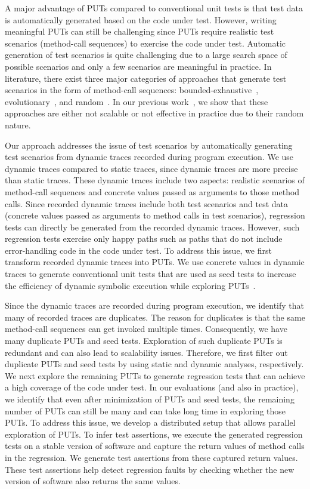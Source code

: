 A major advantage of PUTs compared to conventional unit tests is that test data is automatically
generated based on the code under test. However, writing meaningful PUTs
can still be challenging since PUTs require realistic test scenarios (method-call sequences) to exercise the code under test. 
Automatic generation of test scenarios is quite challenging due to a 
large search space of possible scenarios and only a few scenarios are meaningful in practice.
In literature, there exist three major categories of approaches that generate test scenarios in the form of method-call sequences:
bounded-exhaustive~\cite{khurshid:symbolic, xie:rostra}, evolutionary~\cite{inkumsah08:improving, tonella:etoc}, 
and random~\cite{csallner:jcrasher, JTEST, pacheco:feedback}. In our previous
work~\cite{thummalapenta09:mseqgen}, we show that these approaches are either not scalable or not
effective in practice due to their random nature. 

Our approach addresses the issue of test scenarios by automatically generating test scenarios
from dynamic traces recorded during program execution. 
We use dynamic traces compared to static traces, since dynamic traces are more 
precise than static traces. These dynamic traces include two aspects: realistic scenarios
of method-call sequences and concrete values passed as arguments to those method calls.
Since recorded dynamic traces include both test scenarios and
test data (concrete values passed as arguments to method calls in test scenarios),
regression tests can directly be generated from the recorded dynamic traces.
However, such regression tests exercise only happy paths such
as paths that do not include error-handling code in the code under test.
To address this issue, we first transform recorded dynamic traces
into PUTs. We use concrete values in dynamic traces to generate
conventional unit tests that are used as seed tests to increase
the efficiency of dynamic symbolic execution while exploring PUTs~\cite{patrice08:whitebox}.

Since the dynamic traces are recorded during program execution, 
we identify that many of recorded traces are duplicates. The 
reason for duplicates is that the same method-call sequences
can get invoked multiple times. Consequently, we have many duplicate PUTs and seed tests. 
Exploration of such duplicate PUTs is redundant and can also
lead to scalability issues. Therefore, we first filter
out duplicate PUTs and seed tests by using static and 
dynamic analyses, respectively. We next explore the remaining
PUTs to generate regression tests that can achieve a high coverage
of the code under test. In our evaluations (and also in practice), 
we identify that even after minimization of PUTs and seed tests, 
the remaining number of PUTs can still be many and can take long
time in exploring those PUTs. To address this issue, we develop a 
distributed setup that allows parallel exploration of PUTs.
To infer test assertions, we execute the generated regression
tests on a stable version of software and capture the return values
of method calls in the regression. We generate test assertions from these captured
return values. These test assertions help detect regression faults by
checking whether the new version of software also returns the same values.

